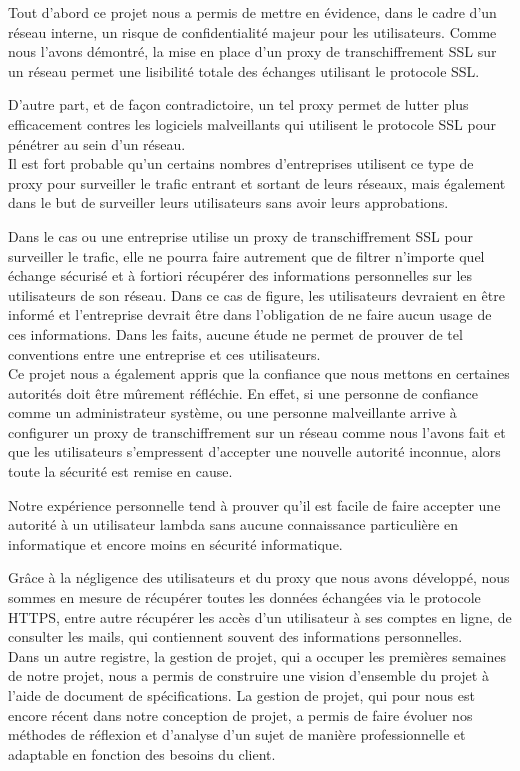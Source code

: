 Tout d'abord ce projet nous a permis de mettre en évidence, dans le cadre d'un 
réseau interne, un risque de confidentialité majeur pour les utilisateurs. Comme
nous l'avons démontré, la mise en place d'un proxy de transchiffrement SSL sur un réseau permet 
une lisibilité totale des échanges utilisant le protocole SSL.

D'autre part, et de façon contradictoire, un tel proxy permet de lutter plus 
efficacement contres les logiciels malveillants qui utilisent le protocole SSL 
pour pénétrer au sein d'un réseau.
~~\\

Il est fort probable qu'un certains nombres d'entreprises utilisent ce type de proxy 
pour surveiller le trafic entrant et sortant de leurs réseaux, mais également 
dans le but de surveiller leurs utilisateurs sans avoir leurs approbations. 

Dans le cas ou une entreprise utilise un proxy de transchiffrement SSL pour 
surveiller le trafic, elle ne pourra faire autrement que de filtrer n'importe 
quel échange sécurisé et à fortiori récupérer des informations personnelles sur 
les utilisateurs de son réseau. Dans ce cas de figure, les utilisateurs 
devraient en être informé et l'entreprise devrait être dans l'obligation de ne 
faire aucun usage de ces informations. Dans les faits, aucune étude ne permet de 
prouver de tel conventions entre une entreprise et ces utilisateurs.
~~\\

Ce projet nous a  également appris que la confiance que nous mettons en certaines autorités doit être mûrement réfléchie.
En effet, si une personne de confiance comme un administrateur système, ou une personne malveillante arrive à
configurer un proxy de transchiffrement sur un réseau comme nous l'avons fait et que les utilisateurs
s'empressent d'accepter une nouvelle autorité inconnue, alors toute la sécurité est remise en cause.

Notre expérience personnelle tend à prouver qu'il est facile de faire accepter 
une autorité à un utilisateur lambda sans aucune connaissance particulière en 
informatique et encore moins en sécurité informatique.

Grâce à la négligence des utilisateurs et du proxy que nous avons développé, nous sommes en mesure de récupérer toutes les données échangées
via le protocole HTTPS, entre autre récupérer les accès d'un utilisateur à ses comptes en ligne, de consulter les mails, qui contiennent souvent
des informations personnelles.
~~\\

Dans un autre registre, la gestion de projet, qui a occuper les premières semaines de notre 
projet, nous a permis de construire une vision d'ensemble du projet à l'aide de document de 
spécifications.
La gestion de projet, qui pour nous est encore récent dans notre conception de projet, a permis de faire évoluer
nos méthodes de réflexion et d'analyse d'un sujet de manière professionnelle et adaptable en fonction des besoins du client.
